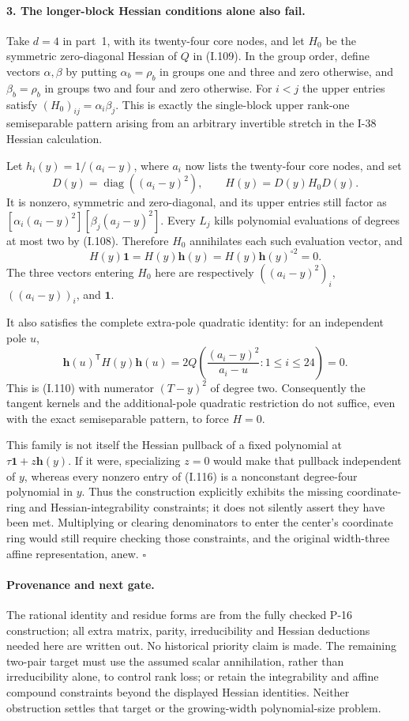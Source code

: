\paragraph{3. The longer-block Hessian conditions alone also fail.}
Take $d=4$ in part~1, with its twenty-four core nodes, and let
$H_0$ be the symmetric zero-diagonal Hessian of $Q$ in (I.109).
In the group order, define vectors $\alpha,\beta$ by putting
$\alpha_b=\rho_b$ in groups one and three and zero otherwise,
and $\beta_b=\rho_b$ in groups two and four and zero otherwise.
For $i<j$ the upper entries satisfy
$(H_0)_{ij}=\alpha_i\beta_j$. This is exactly the single-block
upper rank-one semiseparable pattern arising from an arbitrary
invertible stretch in the I-38 Hessian calculation.

Let $h_i(y)=1/(a_i-y)$, where $a_i$ now lists the twenty-four
core nodes, and set
\[
 D(y)=\operatorname{diag}((a_i-y)^2),\qquad
 H(y)=D(y)H_0D(y).
 \tag{I.116}
\]
It is nonzero, symmetric and zero-diagonal, and its upper
entries still factor as
$[\alpha_i(a_i-y)^2][\beta_j(a_j-y)^2]$.
Every $L_j$ kills polynomial evaluations of degrees at most
two by (I.108). Therefore $H_0$ annihilates each such evaluation
vector, and
\[
 H(y)\mathbf1=H(y)\mathbf h(y)
              =H(y)\mathbf h(y)^{\circ2}=0.
 \tag{I.117}
\]
The three vectors entering $H_0$ here are respectively
$((a_i-y)^2)_i$, $((a_i-y))_i$, and $\mathbf1$.

It also satisfies the complete extra-pole quadratic identity:
for an independent pole $u$,
\[
 \mathbf h(u)^{\mathsf T}H(y)\mathbf h(u)
 =2Q\left(\frac{(a_i-y)^2}{a_i-u}:1\le i\le24\right)=0.
 \tag{I.118}
\]
This is (I.110) with numerator $(T-y)^2$ of degree two.
Consequently the tangent kernels and the additional-pole
quadratic restriction do not suffice, even with the exact
semiseparable pattern, to force $H=0$.

This family is not itself the Hessian pullback of a fixed
polynomial at $\tau\mathbf1+z\mathbf h(y)$. If it were,
specializing $z=0$ would make that pullback independent of $y$,
whereas every nonzero entry of (I.116) is a nonconstant
degree-four polynomial in $y$. Thus the construction explicitly
exhibits the missing coordinate-ring and Hessian-integrability
constraints; it does not silently assert they have been met.
Multiplying or clearing denominators to enter the center's
coordinate ring would still require checking those constraints,
and the original width-three affine representation, anew.
\hfill$\square$

\paragraph{Provenance and next gate.}
The rational identity and residue forms are from the fully
checked P-16 construction; all extra matrix, parity, irreducibility
and Hessian deductions needed here are written out. No historical
priority claim is made. The remaining two-pair target must use
the assumed scalar annihilation, rather than irreducibility
alone, to control rank loss; or retain the integrability and
affine compound constraints beyond the displayed Hessian
identities. Neither obstruction settles that target or the
growing-width polynomial-size problem.



